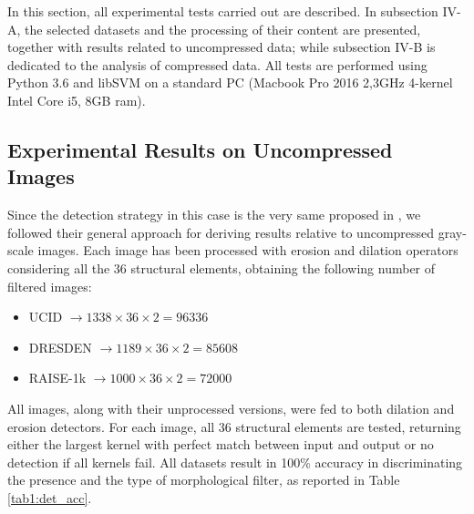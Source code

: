 \documentclass[review]{elsarticle}
\begin{document}

In this section, all experimental tests carried out are described. In subsection IV-A, the selected datasets and the processing of their content are presented, together with results related to uncompressed data; while subsection IV-B is dedicated to the analysis of compressed data. All  tests are performed using Python 3.6 and libSVM on a standard PC (Macbook Pro 2016 2,3GHz 4-kernel Intel Core i5, 8GB ram).


\subsection{Experimental Results on Uncompressed Images}

Since the detection strategy in this case is the very same proposed in \cite{de2017detecting}, we followed their general approach for deriving results relative to uncompressed gray-scale images. Each image has been processed with erosion and dilation operators considering all the 36 structural elements, obtaining the following number of filtered images:

\begin{itemize}
	\item UCID $\rightarrow 1338\times 36 \times 2 = 96336$
	\item DRESDEN $\rightarrow 1189\times 36\times 2 = 85608$
	\item RAISE-1k $\rightarrow 1000\times 36\times 2 = 72000$
\end{itemize}

All images, along with their unprocessed versions, were fed to both dilation and erosion detectors. For each image, all 36 structural elements are tested, returning either the largest kernel with perfect match between input and output or no detection if all kernels fail. All datasets result in 100\% accuracy in discriminating the presence and the type of morphological filter, as reported in Table \ref{tab1:det_acc}.
\end{document}
